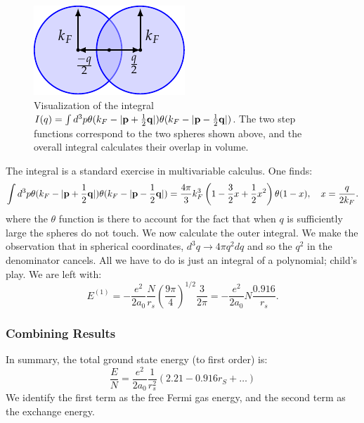 \begin{figure}[htbp]
    \centering
    \includegraphics[]{Images/fig-twosphereoverlap.pdf}

    \caption{Visualization of the integral $I(q) = \int d^3p \theta(k_F - \lvert \mathbf{p} + \frac{1}{2}\mathbf{q} \rvert)\theta(k_F - \lvert \mathbf{p} - \frac{1}{2}\mathbf{q} \rvert)$. The two step functions correspond to the two spheres shown above, and the overall integral calculates their overlap in volume.}
    \label{fig-twosphereoverlap}
\end{figure}

The integral is a standard exercise in multivariable calculus. One finds:
\begin{equation}
    \int d^3p \theta(k_F - \lvert \mathbf{p} + \frac{1}{2}\mathbf{q} \rvert)\theta(k_F - \lvert \mathbf{p} - \frac{1}{2}\mathbf{q} \rvert) = \frac{4\pi}{3}k_F^3\left(1 - \frac{3}{2}x + \frac{1}{2}x^2\right)\theta(1 - x), \quad x = \frac{q}{2k_F}.
\end{equation}
where the $\theta$ function is there to account for the fact that when $q$ is sufficiently large the spheres do not touch. We now calculate the outer integral. We make the observation that in spherical coordinates, $d^3q \to 4\pi q^2 dq$ and so the $q^2$ in the denominator cancels. All we have to do is just an integral of a polynomial; child's play. We are left with:
\begin{equation}
    E^{(1)} = -\frac{e^2}{2a_0}\frac{N}{r_s}\left(\frac{9\pi}{4}\right)^{1/2}\frac{3}{2\pi} = -\frac{e^2}{2a_0}N\frac{0.916}{r_s}.
\end{equation}

\subsubsection{Combining Results}
In summary, the total ground state energy (to first order) is:
\begin{equation}\label{eq-pertresultjellium}
    \frac{E}{N} = \frac{e^2}{2a_0}\frac{1}{r_s^2}\left(2.21 - 0.916r_S + \ldots\right)
\end{equation}
We identify the first term as the free Fermi gas energy, and the second term as the exchange energy.

